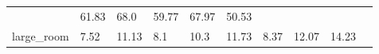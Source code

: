 \begin{table}[t]
\begin{center}
\begin{tabular}{llllllllll}
{            } 

        
           &
           
           61.83
           

        
           &
           
           68.0
           

        
           &
           
           59.77
           

        
           &
           
           67.97
           

        
           &
           
           50.53
           

         \\

        large_room
        
           &
           
           7.52
           

        
           &
           
           11.13
           

        
           &
           
           8.1
           

        
           &
           
           10.3
           

        
           &
           
           11.73
           

        
           &
           
           8.37
           

        
           &
           
           12.07
           

        
           &
           
           14.23
           

        
           &
           

\end{tabular}
\end{center}
\end{table}
